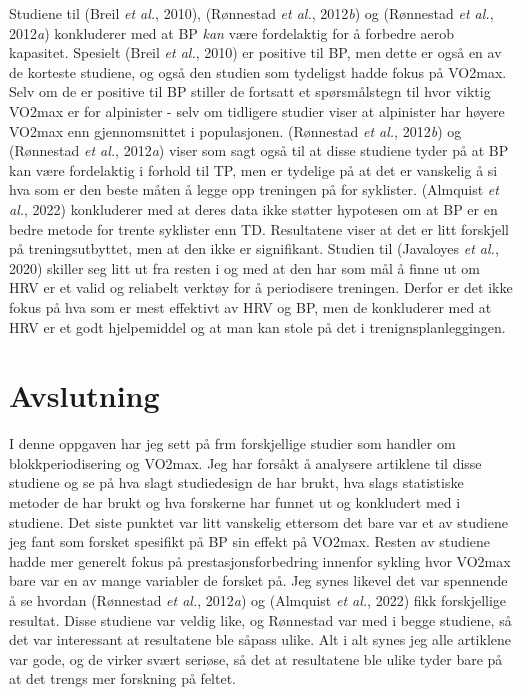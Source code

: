 \documentclass[
  letterpaper,
  DIV=11,
  numbers=noendperiod]{scrreprt}
\begin{document}
Studiene til (Breil \emph{et al.}, 2010), (Rønnestad \emph{et al.},
2012\emph{b}) og (Rønnestad \emph{et al.}, 2012\emph{a}) konkluderer med
at BP \emph{kan} være fordelaktig for å forbedre aerob kapasitet.
Spesielt (Breil \emph{et al.}, 2010) er positive til BP, men dette er
også en av de korteste studiene, og også den studien som tydeligst hadde
fokus på VO2max. Selv om de er positive til BP stiller de fortsatt et
spørsmålstegn til hvor viktig VO2max er for alpinister - selv om
tidligere studier viser at alpinister har høyere VO2max enn
gjennomsnittet i populasjonen. (Rønnestad \emph{et al.}, 2012\emph{b})
og (Rønnestad \emph{et al.}, 2012\emph{a}) viser som sagt også til at
disse studiene tyder på at BP kan være fordelaktig i forhold til TP, men
er tydelige på at det er vanskelig å si hva som er den beste måten å
legge opp treningen på for syklister. (Almquist \emph{et al.}, 2022)
konkluderer med at deres data ikke støtter hypotesen om at BP er en
bedre metode for trente syklister enn TD. Resultatene viser at det er
litt forskjell på treningsutbyttet, men at den ikke er signifikant.
Studien til (Javaloyes \emph{et al.}, 2020) skiller seg litt ut fra
resten i og med at den har som mål å finne ut om HRV er et valid og
reliabelt verktøy for å periodisere treningen. Derfor er det ikke fokus
på hva som er mest effektivt av HRV og BP, men de konkluderer med at HRV
er et godt hjelpemiddel og at man kan stole på det i
trenignsplanleggingen.


\chapter{Avslutning}\label{avslutning}

I denne oppgaven har jeg sett på frm forskjellige studier som handler om
blokkperiodisering og VO2max. Jeg har forsåkt å analysere artiklene til
disse studiene og se på hva slagt studiedesign de har brukt, hva slags
statistiske metoder de har brukt og hva forskerne har funnet ut og
konkludert med i studiene. Det siste punktet var litt vanskelig ettersom
det bare var et av studiene jeg fant som forsket spesifikt på BP sin
effekt på VO2max. Resten av studiene hadde mer generelt fokus på
prestasjonsforbedring innenfor sykling hvor VO2max bare var en av mange
variabler de forsket på. Jeg synes likevel det var spennende å se
hvordan (Rønnestad \emph{et al.}, 2012\emph{a}) og (Almquist \emph{et
al.}, 2022) fikk forskjellige resultat. Disse studiene var veldig like,
og Rønnestad var med i begge studiene, så det var interessant at
resultatene ble såpass ulike. Alt i alt synes jeg alle artiklene var
gode, og de virker svært seriøse, så det at resultatene ble ulike tyder
bare på at det trengs mer forskning på feltet.
\end{document}
